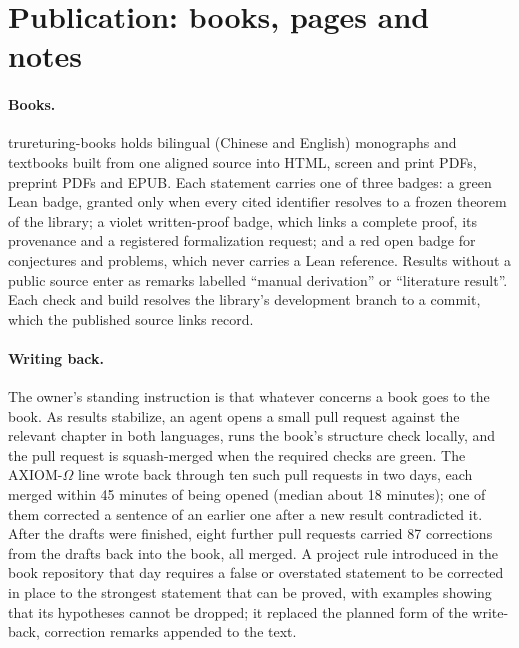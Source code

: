 \documentclass[11pt]{article}
\begin{document}
\section{Publication: books, pages and notes}
\label{sec:publication}
\paragraph{Books.} trureturing-books \citep{booksrepo} holds bilingual
(Chinese and English) monographs and textbooks built from one aligned source
into HTML, screen and print PDFs, preprint PDFs and EPUB. Each statement
carries one of three badges: a green Lean badge, granted only when every
cited identifier resolves to a frozen theorem of the library; a violet
written-proof badge, which links a complete proof, its provenance and a
registered formalization request; and a red open badge for conjectures and
problems, which never carries a Lean reference. Results without a public
source enter as remarks labelled ``manual derivation'' or ``literature
result''. Each check and build resolves the library's development branch to
a commit, which the published source links record.

\paragraph{Writing back.} The owner's standing instruction is that whatever
concerns a book goes to the book. As results stabilize, an agent opens a
small pull request against the relevant chapter in both languages, runs the
book's structure check locally, and the pull request is squash-merged when
the required checks are green. The AXIOM-$\Omega$ line wrote back through
ten such pull requests in two days, each merged within 45 minutes of being
opened (median about 18 minutes); one of them corrected a sentence of an
earlier one after a new result contradicted it. After the drafts were
finished, eight further pull requests carried 87 corrections from the drafts
back into the book, all merged. A project rule introduced in the book
repository that day requires a false or overstated statement to be corrected
in place to the strongest statement that can be proved, with examples showing
that its hypotheses cannot be dropped; it replaced the planned form of the
write-back, correction remarks appended to the text.
\end{document}
